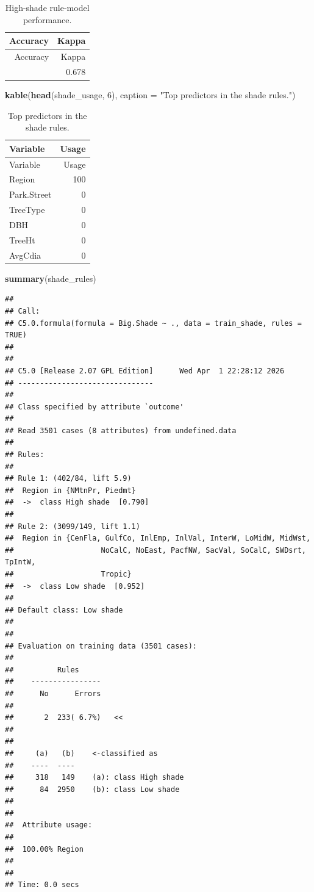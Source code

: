 \documentclass[
  11pt,
]{article}
\newenvironment{Shaded}{\begin{snugshade}}{\end{snugshade}}
\newcommand{\AttributeTok}[1]{\textcolor[rgb]{0.13,0.29,0.53}{#1}}
\newcommand{\DecValTok}[1]{\textcolor[rgb]{0.00,0.00,0.81}{#1}}
\newcommand{\FunctionTok}[1]{\textcolor[rgb]{0.13,0.29,0.53}{\textbf{#1}}}
\newcommand{\NormalTok}[1]{#1}
\newcommand{\StringTok}[1]{\textcolor[rgb]{0.31,0.60,0.02}{#1}}
\begin{document}
\begin{longtable}[]{@{}rr@{}}
\caption{High-shade rule-model performance.}\tabularnewline
\toprule\noalign{}
Accuracy & Kappa \\
\midrule\noalign{}
\endfirsthead
\toprule\noalign{}
Accuracy & Kappa \\
\midrule\noalign{}
\endhead
\bottomrule\noalign{}
\endlastfoot
0.929 & 0.678 \\
\end{longtable}

\begin{Shaded}
\begin{Highlighting}[]
\FunctionTok{kable}\NormalTok{(}\FunctionTok{head}\NormalTok{(shade\_usage, }\DecValTok{6}\NormalTok{), }\AttributeTok{caption =} \StringTok{"Top predictors in the shade rules."}\NormalTok{)}
\end{Highlighting}
\end{Shaded}

\begin{longtable}[]{@{}lr@{}}
\caption{Top predictors in the shade rules.}\tabularnewline
\toprule\noalign{}
Variable & Usage \\
\midrule\noalign{}
\endfirsthead
\toprule\noalign{}
Variable & Usage \\
\midrule\noalign{}
\endhead
\bottomrule\noalign{}
\endlastfoot
Region & 100 \\
Park.Street & 0 \\
TreeType & 0 \\
DBH & 0 \\
TreeHt & 0 \\
AvgCdia & 0 \\
\end{longtable}

\begin{Shaded}
\begin{Highlighting}[]
\FunctionTok{summary}\NormalTok{(shade\_rules)}
\end{Highlighting}
\end{Shaded}

\begin{verbatim}
## 
## Call:
## C5.0.formula(formula = Big.Shade ~ ., data = train_shade, rules = TRUE)
## 
## 
## C5.0 [Release 2.07 GPL Edition]      Wed Apr  1 22:28:12 2026
## -------------------------------
## 
## Class specified by attribute `outcome'
## 
## Read 3501 cases (8 attributes) from undefined.data
## 
## Rules:
## 
## Rule 1: (402/84, lift 5.9)
##  Region in {NMtnPr, Piedmt}
##  ->  class High shade  [0.790]
## 
## Rule 2: (3099/149, lift 1.1)
##  Region in {CenFla, GulfCo, InlEmp, InlVal, InterW, LoMidW, MidWst,
##                    NoCalC, NoEast, PacfNW, SacVal, SoCalC, SWDsrt, TpIntW,
##                    Tropic}
##  ->  class Low shade  [0.952]
## 
## Default class: Low shade
## 
## 
## Evaluation on training data (3501 cases):
## 
##          Rules     
##    ----------------
##      No      Errors
## 
##       2  233( 6.7%)   <<
## 
## 
##     (a)   (b)    <-classified as
##    ----  ----
##     318   149    (a): class High shade
##      84  2950    (b): class Low shade
## 
## 
##  Attribute usage:
## 
##  100.00% Region
## 
## 
## Time: 0.0 secs
\end{verbatim}
\end{document}
